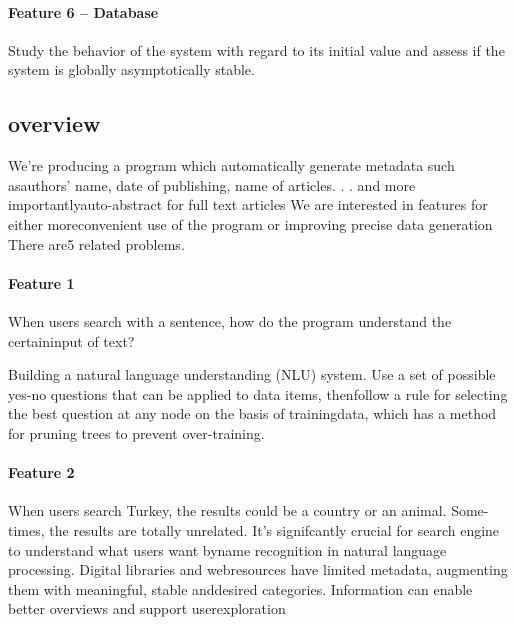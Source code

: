 \documentclass[a4paper]{article} %
\begin{document}
	\paragraph*{Feature 6 -- Database}
	\label{task1:feature6}
	
	Study the behavior of the system with regard to its initial value and assess if the system is globally asymptotically stable.
	\clearpage
	
	
	\subsection*{overview}
	\label{task1}
	We're  producing  a  program  which  automatically  generate  metadata  such  asauthors' name,  date of publishing,  name of articles. . .   and more importantlyauto-abstract for full text articles We are interested in features for either moreconvenient use of the program or improving precise data generation There are5 related problems.
	
	
	\paragraph*{Feature 1 }
	\label{task1:feature1}
	When users search with a sentence, how do the program understand the certaininput of text?
	
	Building a natural language understanding (NLU) system.
	Use a set of possible yes-no questions that can be applied to data items, thenfollow a rule for selecting the best question at any node on the basis of trainingdata, which has a method for pruning trees to prevent over-training.
	
	\paragraph*{Feature 2 }
	\label{task1:feature2}
	
	When users search Turkey, the results could be a country or an animal.  Some-times, the results are totally unrelated.
	It's  signifcantly  crucial  for  search  engine  to  understand  what  users  want  byname  recognition  in  natural  language  processing.   Digital  libraries  and  webresources have limited metadata, augmenting them with meaningful, stable anddesired categories.  Information can enable better overviews and support userexploration
\end{document}
